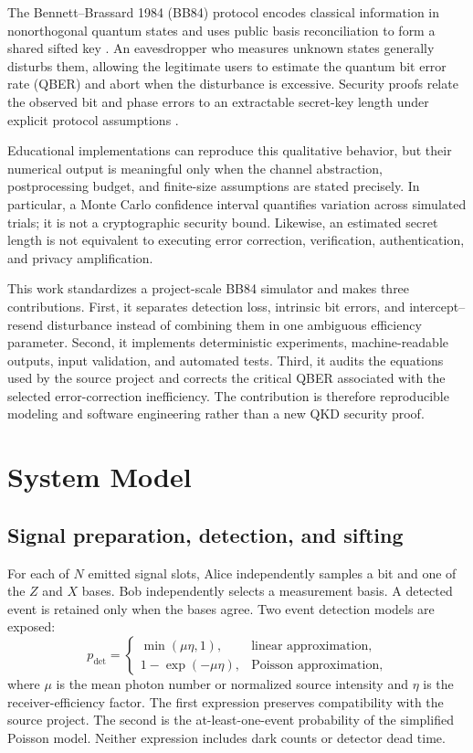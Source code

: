 \documentclass[conference]{IEEEtran}
\begin{document}
The Bennett--Brassard 1984 (BB84) protocol encodes classical information in
nonorthogonal quantum states and uses public basis reconciliation to form a
shared sifted key \cite{bennett1984}. An eavesdropper who measures unknown
states generally disturbs them, allowing the legitimate users to estimate the
quantum bit error rate (QBER) and abort when the disturbance is excessive.
Security proofs relate the observed bit and phase errors to an extractable
secret-key length under explicit protocol assumptions \cite{shor2000}.

Educational implementations can reproduce this qualitative behavior, but
their numerical output is meaningful only when the channel abstraction,
postprocessing budget, and finite-size assumptions are stated precisely.
In particular, a Monte Carlo confidence interval quantifies variation across
simulated trials; it is not a cryptographic security bound. Likewise, an
estimated secret length is not equivalent to executing error correction,
verification, authentication, and privacy amplification.

This work standardizes a project-scale BB84 simulator and makes three
contributions. First, it separates detection loss, intrinsic bit errors, and
intercept--resend disturbance instead of combining them in one ambiguous
efficiency parameter. Second, it implements deterministic experiments,
machine-readable outputs, input validation, and automated tests. Third, it
audits the equations used by the source project and corrects the critical QBER
associated with the selected error-correction inefficiency. The contribution
is therefore reproducible modeling and software engineering rather than a new
QKD security proof.

\section{System Model}

\subsection{Signal preparation, detection, and sifting}

For each of \(N\) emitted signal slots, Alice independently samples a bit and
one of the \(Z\) and \(X\) bases. Bob independently selects a measurement
basis. A detected event is retained only when the bases agree. Two event
detection models are exposed:
\begin{equation}
p_{\mathrm{det}} =
\begin{cases}
\min(\mu\eta,1), & \text{linear approximation},\\
1-\exp(-\mu\eta), & \text{Poisson approximation},
\end{cases}
\label{eq:detection}
\end{equation}
where \(\mu\) is the mean photon number or normalized source intensity and
\(\eta\) is the receiver-efficiency factor. The first expression preserves
compatibility with the source project. The second is the at-least-one-event
probability of the simplified Poisson model. Neither expression includes dark
counts or detector dead time.
\end{document}
